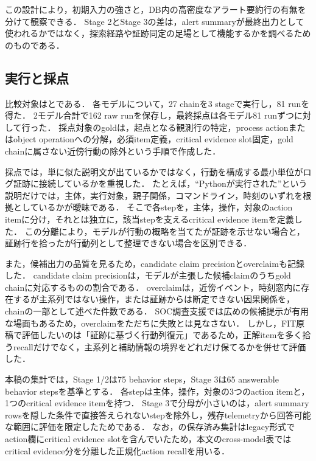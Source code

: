この設計により，初期入力の強さと，DB内の高密度なアラート要約行の有無を分けて観察できる．
Stage 2とStage 3の差は，alert summaryが最終出力として使われるかではなく，探索経路や証跡同定の足場として機能するかを調べるためのものである．

\subsection{実行と採点}

比較対象はとである．
各モデルについて，27 chainを3 stageで実行し，81 runを得た．
2モデル合計で162 raw runを保存し，最終採点は各モデル81 runずつに対して行った．
採点対象のgoldは，起点となる観測行の特定，process actionまたはobject operationへの分解，必須item定義，critical evidence slot固定，gold chainに属さない近傍行動の除外という手順で作成した．

採点では，単に似た説明文が出ているかではなく，行動を構成する最小単位がログ証跡に接続しているかを重視した．
たとえば，``Pythonが実行された''という説明だけでは，主体，実行対象，親子関係，コマンドライン，時刻のいずれを根拠としているかが曖昧である．
そこで各stepを，主体，操作，対象のaction itemに分け，それとは独立に，該当stepを支えるcritical evidence itemを定義した．
この分離により，モデルが行動の概略を当てたが証跡を示せない場合と，証跡行を拾ったが行動列として整理できない場合を区別できる．

また，候補出力の品質を見るため，candidate claim precisionとoverclaimも記録した．
candidate claim precisionは，モデルが主張した候補claimのうちgold chainに対応するものの割合である．
overclaimは，近傍イベント，時刻窓内に存在するが主系列ではない操作，または証跡からは断定できない因果関係を，chainの一部として述べた件数である．
SOC調査支援では広めの候補提示が有用な場面もあるため，overclaimをただちに失敗とは見なさない．
しかし，FIT原稿で評価したいのは「証跡に基づく行動列復元」であるため，正解itemを多く拾うrecallだけでなく，主系列と補助情報の境界をどれだけ保てるかを併せて評価した．

本稿の集計では，Stage 1/2は75 behavior steps，Stage 3は65 answerable behavior stepsを基準とする．
各stepは主体，操作，対象の3つのaction itemと，1つのcritical evidence itemを持つ．
Stage 3で分母が小さいのは，alert summary rowsを隠した条件で直接答えられないstepを除外し，残存telemetryから回答可能な範囲に評価を限定したためである．
なお，の保存済み集計はlegacy形式でaction欄にcritical evidence slotを含んでいたため，本文のcross-model表ではcritical evidence分を分離した正規化action recallを用いる．


